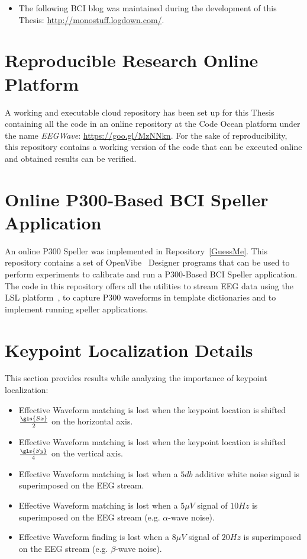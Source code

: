 \begin{itemize}
\item The following BCI blog was maintained during the development of this Thesis: \url{http://monostuff.logdown.com/}.
\end{itemize}

\section{Reproducible Research Online Platform}

A working and executable cloud repository has been set up for this Thesis containing all the code in an online repository at the Code Ocean platform under the name \textit{EEGWave}: \url{https://goo.gl/MzNNkn}.  For the sake of reproducibility, this repository contains a working version of the code that can be executed online and obtained results can be verified.

\section{Online P300-Based BCI Speller Application}

An online P300 Speller was implemented in Repository~\ref{GuessMe}.  This repository contains a set of OpenVibe~\cite{Renard2010} Designer programs that can be used to perform experiments to calibrate and run a P300-Based BCI Speller application.  The code in this repository offers all the utilities to stream EEG data using the LSL platform~\cite{Labstreaminglayer}, to capture P300 waveforms in template dictionaries and to implement running speller applications.

\section{Keypoint Localization Details}

This section provides results while analyzing the importance of keypoint localization:\\

\begin{itemize}
\item Effective Waveform matching is lost when the keypoint location is shifted $\frac{\gls{Sx}}{2}$ on the horizontal axis.
\item Effective Waveform matching is lost when the keypoint location is shifted $\frac{\gls{Sy}}{4}$ on the vertical axis.
\item Effective Waveform matching is lost when a $5 \si{db}$ additive white noise signal is superimposed on the EEG stream. 
\item Effective Waveform matching is lost when a $5 \mu V$ signal of $10 \si{Hz}$ is superimposed on the EEG stream (e.g. $\alpha$-wave noise).
\item Effective Waveform finding is lost when a $8 \mu V$ signal of $20 \si{Hz}$ is superimposed on the EEG stream (e.g. $\beta$-wave noise).  
\end{itemize}

